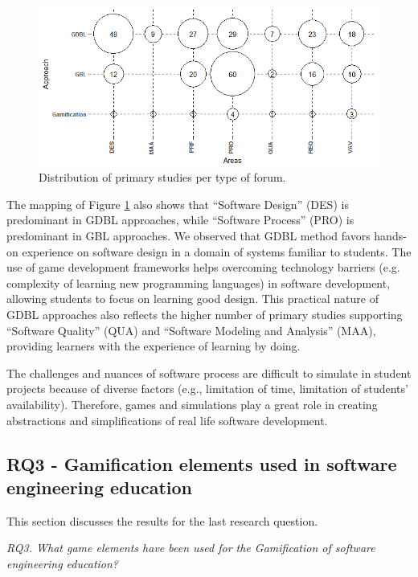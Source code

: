 \begin{figure}[!h]%
\centering
\includegraphics[width = 1\textwidth]{img/smsBubble.png}
\caption{Distribution of primary studies per type of forum.}
\label{fig:smsbubble}
\end{figure}

The mapping of Figure \ref{fig:smsbubble} also shows that “Software Design” (DES) is predominant in GDBL approaches, while “Software Process” (PRO) is predominant in GBL approaches. We observed that GDBL method favors hands-on experience on software design in a domain of systems familiar to students. The use of game development frameworks helps overcoming technology barriers (e.g. complexity of learning new programming languages) in software development, allowing students to focus on learning good design. This practical nature of GDBL approaches also reflects the higher number of primary studies supporting “Software Quality” (QUA) and “Software Modeling and Analysis” (MAA), providing learners with the experience of learning by doing.

The challenges and nuances of software process are difficult to simulate in student projects because of diverse factors (e.g., limitation of time, limitation of students’ availability). Therefore, games and simulations play a great role in creating abstractions and simplifications of real life software development.

\subsection{RQ3 - Gamification elements used in software engineering education}
\label{sec:smsrq3}

This section discusses the results for the last research question.

\textit{RQ3. What game elements have been used for the Gamification of software engineering education?}

